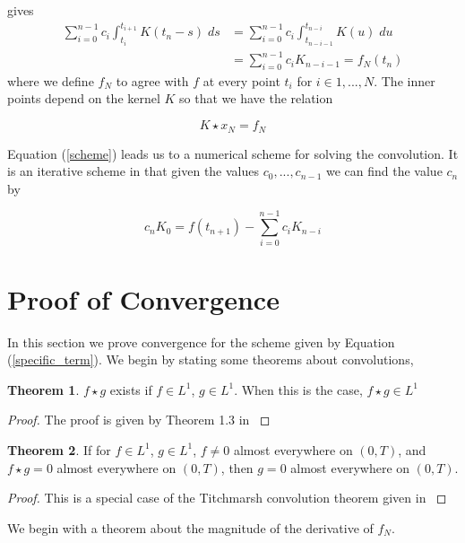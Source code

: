\documentclass[11pt]{article}
\numberwithin{equation}{section}
\theoremstyle{definition}
\newtheorem{theorem}{Theorem}[section]
\newcommand{\eqn}[2]{
  \begin{equation}
    \label{#1}
    #2
  \end{equation}
}
\newcommand{\eqr}[1]{Equation (\ref{#1})}
\begin{document}
gives
\begin{align}
\nonumber       \sum_{i=0}^{n-1} c_i \int_{t_i}^{t_{i+1}} K(t_n - s)\; ds
                  &= \sum_{i=0}^{n-1} c_i \int_{t_{n-i-1}}^{t_{n-i}} K(u)\; du\\
\label{scheme}    &= \sum_{i=0}^{n-1} c_i K_{n-i-1} = f_N(t_n)
\end{align}
where we define $f_N$ to agree with $f$ at every point $t_i$ for $i \in 1, ..., N$.
The inner points depend on the kernel $K$ so that we have the relation
\eqn{approx_relation}{
  K \star x_N = f_N
}
\eqr{scheme} leads us to a numerical scheme for solving the convolution. It is
an iterative scheme in that given the values $c_0, ..., c_{n-1}$ we can find
the value $c_n$ by
\eqn{specific_term}{
  c_nK_0 = f(t_{n+1}) - \sum_{i=0}^{n-1} c_i K_{n-i}
}
\section{Proof of Convergence}
In this section we prove convergence for the scheme given by \eqr{specific_term}.
We begin by stating some theorems about convolutions,
\begin{theorem}
  \label{convolution_exists}
  $f \star g$ exists if $f \in L^1$, $g \in L^1$. When this is the case, $f \star g \in L^1$
\end{theorem}
\begin{proof}
The proof is given by Theorem 1.3 in \cite{stein71}
\end{proof}

\begin{theorem}
  \label{titchmarsh}
  If for $f \in L^1$, $g \in L^1$, $f \neq 0$ almost everywhere on $(0, T)$, and $f \star g = 0$ almost everywhere on $(0, T)$, then $g = 0$ almost everywhere on $(0, T)$.
\end{theorem}
\begin{proof}
This is a special case of the Titchmarsh convolution theorem given in \cite{titchmarsh}
\end{proof}

We begin with a theorem about the magnitude of the derivative of $f_N$.
\end{document}
